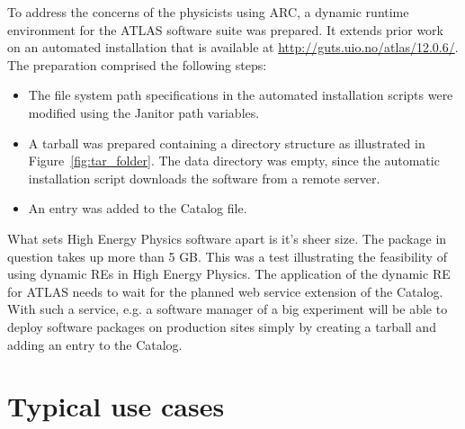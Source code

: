 To address the concerns of the physicists using ARC, a dynamic runtime environment for the
ATLAS software suite was prepared. It extends prior work on an automated installation that is available at
\href{http://guts.uio.no/atlas/12.0.6/}{http://guts.uio.no/atlas/12.0.6/}. The preparation comprised the following steps:
\begin{itemize}
    \item The file system path specifications in the automated installation scripts were modified using the Janitor
       path variables.
    \item A tarball was prepared containing a directory structure as illustrated in Figure~\ref{fig:tar_folder}. The data directory
       was empty, since the automatic installation script downloads the software from a remote server.
    \item An entry was added to the Catalog file.
\end{itemize}

What sets High Energy Physics software apart is it's sheer size. The package in question takes up more than
5 GB. This was a test illustrating the feasibility of using dynamic REs in High Energy Physics. The application
of the dynamic RE for ATLAS needs to wait for the planned web service extension of the Catalog. With such a
service, e.g. a software manager of a big experiment will be able to deploy software packages on production
sites simply by creating a tarball and adding an entry to the Catalog.


%
%
%
%

\section{Typical use cases}\label{sec:catalog}

